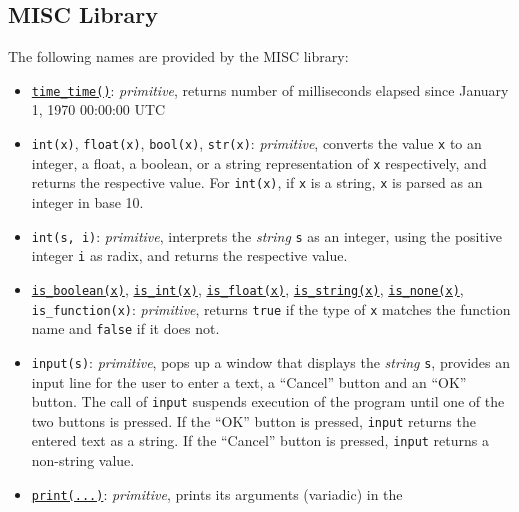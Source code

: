 \subsection*{MISC Library}

The following
names are provided by the MISC library:
\begin{itemize}
  \item
    \href{https://sourceacademy.org/sicpjs/1.2.6\#ex_1.22}{\lstinline{time_time()}}:
    \textit{primitive}, returns number of milliseconds elapsed since
    January 1, 1970 00:00:00 UTC
  \item \verb#int#\texttt{(x)}, \verb#float#\texttt{(x)},
    \verb#bool#\texttt{(x)}, \verb#str#\texttt{(x)}: \textit{primitive},
    converts the value \texttt{x} to an integer, a float, a boolean, or a string
    representation of \texttt{x} respectively, and returns the
    respective value. For \verb#int#\texttt{(x)}, if \texttt{x} is a string,
    \texttt{x} is parsed
    as an integer in base 10.
  \item \verb#int#\texttt{(s, i)}: \textit{primitive},
    interprets the \emph{string} \texttt{s} as an integer, using the
    positive integer \texttt{i} as radix, and returns the respective value.
  \item
    \href{https://sourceacademy.org/sicpjs/4.1.2\#p2}{\lstinline{is_boolean(x)}},
    \href{https://sourceacademy.org/sicpjs/2.3.2\#p5}{\lstinline{is_int(x)}},
    \href{https://sourceacademy.org/sicpjs/2.3.2\#p5}{\lstinline{is_float(x)}},
    \href{https://sourceacademy.org/sicpjs/2.3.2\#p7}{\lstinline{is_string(x)}},
    \href{https://sourceacademy.org/sicpjs/4.1.2\#p2}{\lstinline{is_none(x)}},
    \verb#is_function#\texttt{(x)}: \textit{primitive}, returns
    \texttt{true} if the type of \texttt{x} matches the function name
    and \texttt{false} if it does not.
  \item \texttt{input(s)}: \textit{primitive}, pops up a window that
    displays the \emph{string} \texttt{s}, provides
    an input line for the user to enter a text, a ``Cancel'' button
    and an ``OK'' button. The call of \texttt{input}
    suspends execution of the program until one of the two buttons is
    pressed. If
    the ``OK'' button is pressed, \texttt{input} returns the entered
    text as a string.
    If the ``Cancel'' button is pressed, \texttt{input} returns a
    non-string value.
  \item
    \href{https://sourceacademy.org/sicpjs/1.2.6\#footnote-7}{\texttt{print(...)}}:
    \textit{primitive}, prints its arguments (variadic) in the

\end{itemize}

